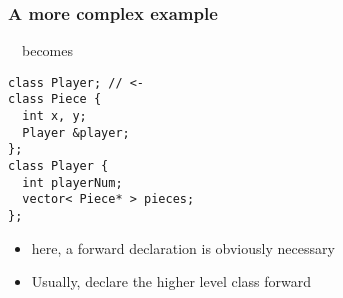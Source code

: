 \documentclass{slides}
\begin{document}
\begin{frame}[fragile]
  \frametitle{A more complex example}

  ~~becomes
  \medskip

\begin{lstlisting}
class Player; // <-
class Piece {
  int x, y;
  Player &player;
};
class Player {
  int playerNum;
  vector< Piece* > pieces;
};
\end{lstlisting}

  \begin{itemize}
  \item here, a forward declaration is obviously necessary
  \item Usually, declare the higher level class forward
  \end{itemize}
\end{frame}
\end{document}
